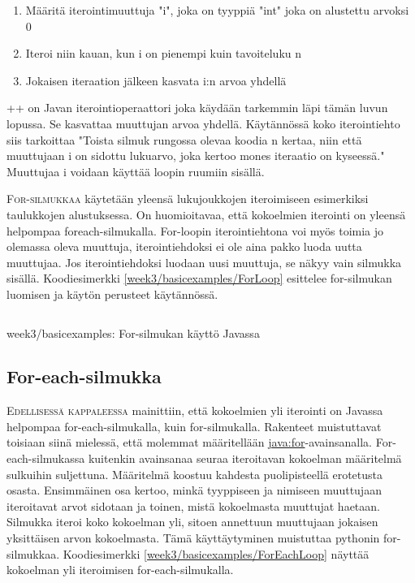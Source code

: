 \documentclass[openany]{book}
\newcommand{\newthought}[1]{\smallskip\textsc{#1}}
\newcommand{\java}[1]{\underline{\gls{java:#1}}}
\newcommand{\code}[3]{
	\begin{listing}
		\linespread{0.85}
		\inputminted{java}{OhjelmointiopasEsimerkit/src/#1/#2.java}
		\caption{#1: #3}
		\label{#1/#2}
	\end{listing}
}
\begin{document}
\begin{enumerate}
	\item{}Määritä iterointimuuttuja "i", joka on tyyppiä "int" joka on alustettu arvoksi 0
	\item{}Iteroi niin kauan, kun i on pienempi kuin tavoiteluku n
	\item{}Jokaisen iteraation jälkeen kasvata i:n arvoa yhdellä
\end{enumerate}

++ on Javan iterointioperaattori joka käydään tarkemmin läpi tämän luvun lopussa. Se kasvattaa
muuttujan arvoa yhdellä. Käytännössä koko iterointiehto siis tarkoittaa "Toista silmuk rungossa
olevaa koodia n kertaa, niin että muuttujaan i on sidottu lukuarvo, joka kertoo mones iteraatio
on kyseessä." Muuttujaa i voidaan käyttää loopin ruumiin sisällä. 

\newthought{For-silmukkaa} käytetään yleensä lukujoukkojen iteroimiseen esimerkiksi taulukkojen
alustuksessa. On huomioitavaa, että kokoelmien iterointi on yleensä helpompaa foreach-silmukalla.
For-loopin iterointiehtona voi myös toimia jo olemassa oleva muuttuja, iterointiehdoksi ei ole
aina pakko luoda uutta muuttujaa. Jos iterointiehdoksi luodaan uusi muuttuja, se näkyy vain
silmukka sisällä. Koodiesimerkki \ref{week3/basicexamples/ForLoop} esittelee for-silmukan luomisen
ja käytön perusteet käytännössä.

\code{week3/basicexamples}{ForLoop}{For-silmukan käyttö Javassa}

\subsection{For-each-silmukka}
\label{for each}

\newthought{Edellisessä kappaleessa} mainittiin, että kokoelmien yli iterointi on Javassa
helpompaa for-each-silmukalla, kuin for-silmukalla. Rakenteet muistuttavat toisiaan siinä
mielessä, että molemmat määritellään \java{for}-avainsanalla. For-each-silmukassa kuitenkin
avainsanaa seuraa iteroitavan kokoelman määritelmä sulkuihin suljettuna. Määritelmä koostuu
kahdesta puolipisteellä erotetusta osasta. Ensimmäinen osa kertoo, minkä tyyppiseen ja nimiseen
muuttujaan iteroitavat arvot sidotaan ja toinen, mistä kokoelmasta muuttujat haetaan. Silmukka
iteroi koko kokoelman yli, sitoen annettuun muuttujaan jokaisen yksittäisen arvon kokoelmasta.
Tämä käyttäytyminen muistuttaa pythonin for-silmukkaa. Koodiesimerkki
\ref{week3/basicexamples/ForEachLoop} näyttää kokoelman yli iteroimisen for-each-silmukalla.
\end{document}
